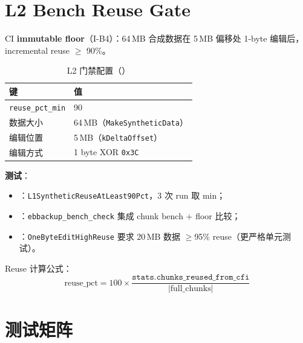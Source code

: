\section{L2 Bench Reuse Gate}
\label{sec:l2-reuse-gate}

CI \textbf{immutable floor}（I-B4）：64\,MB 合成数据在 5\,MB 偏移处 1-byte 编辑后，incremental reuse $\geq$ 90\%。

\begin{table}[htbp]
\centering
\caption{L2 门禁配置（）}
\label{tab:l2-gate}
\begin{tabular}{@{}ll@{}}
\toprule
键 & 值 \\
\midrule
\texttt{reuse\_pct\_min} & 90 \\
数据大小 & 64\,MB（\texttt{MakeSyntheticData}） \\
编辑位置 & 5\,MB（\texttt{kDeltaOffset}） \\
编辑方式 & 1 byte XOR \texttt{0x3C} \\
\bottomrule
\end{tabular}
\end{table}

\textbf{测试}：
\begin{itemize}[nosep]
  \item {}：\texttt{L1SyntheticReuseAtLeast90Pct}，3 次 run 取 min；
  \item {}：\texttt{ebbackup\_bench\_check} 集成 chunk bench + floor 比较；
  \item {}：\texttt{OneByteEditHighReuse} 要求 20\,MB 数据 $\geq$95\% reuse（更严格单元测试）。
\end{itemize}

Reuse 计算公式：
\[
\text{reuse\_pct} = 100 \times \frac{\texttt{stats.chunks\_reused\_from\_cfi}}{|\text{full\_chunks}|}
\]

\section{测试矩阵}
\label{sec:hcrbo-tests}


